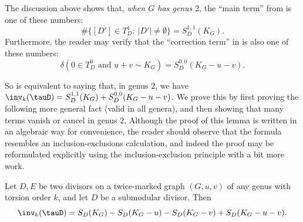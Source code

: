 The discussion above shows that, \emph{when $G$ has genus $2$}, the ``main term'' from  is one of these numbers: 
$$
\# \{ [D'] \in T^1_D:\ |D'| \neq \emptyset \} = S^{1,1}_D(K_G).
$$
Furthermore, the reader may verify that the ``correction term'' in  is also one of these numbers:
$$
\delta( 0 \in T^0_D \mbox{ and } u+v \sim K_G) = S^{0,0}_D(K_G-u-v).
$$

So  is equivalent to saying that, in genus $2$, we have $\inv_k(\tauD) = S^{1,1}_D(K_G) + S^{0,0}_D(K_G-u-v)$. We prove this by first proving the following more general fact (valid in all genera), and then showing that many terms vanish or cancel in genus $2$. Although the proof of this lemma is written in an algebraic way for convenience, the reader should observe that the formula resembles an inclusion-exclusions calculation, and indeed the proof may be reformulated explicitly using the inclusion-exclusion principle with a bit more work.

\begin{lemma}
\label{lem:invtauGeneral}
Let $D,E$ be two divisors on a twice-marked graph $(G,u,v)$ of any genus with torsion order $k$, and let $D$ be a submodular divisor. Then
$$
\inv_k(\tauD) = S_D(K_G) - S_D(K_G-u) - S_D(K_G-v) + S_D(K_G-u-v).
$$
\end{lemma}

